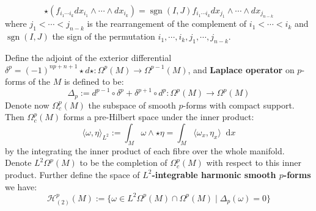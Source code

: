 \documentclass[11pt]{report}
\theoremstyle{definition}
\theoremstyle{plain}
\DeclareMathOperator{\sign}{sgn}
\newcommand{\brac}[1]{\langle #1 \rangle}
\newcommand{\mass}[1]{\mathop{}\mathrm{d}{#1}}
\begin{document}
\begin{equation}
\star (f_{i_1\cdots i_k}dx_{i_1}\wedge \cdots\wedge dx_{i_k})= \sign(I,J) f_{i_1\cdots i_k}dx_{j_1}\wedge \cdots\wedge dx_{j_{n-k}}
\end{equation}
where $j_1<\cdots <j_{n-k}$ is the rearrangement of the complement of $i_1<\cdots <i_k$ and $\sign(I, J)$ the sign of the permutation $i_1, \cdots, i_k, j_1, \cdots, j_{n-k}$.
\par Define the adjoint of the exterior differential $\delta^p=(-1)^{np+n+1}\star d \star:\Omega^p(M)\to \Omega^{p-1}(M)$, and \textbf{Laplace operator} on $p$-forms of the $M$ is defined to be:
\begin{equation}
\Delta_p:=d^{p-1}\circ \delta^p+\delta^{p+1}\circ d^p:\Omega^p(M)\to \Omega^p(M)
\end{equation}
Denote now $\Omega_c^p(M)$ the subspace of smooth $p$-forms with compact support. Then $\Omega^p_c(M)$ forms a pre-Hilbert space under the inner product:
\begin{equation}
\brac{\omega, \eta}_{L^2}:=\int_M\omega\wedge \star\eta=\int_M\brac{\omega_x, \eta_x}\mass{x}
\end{equation}
by the integrating the inner product of each fibre over the whole manifold. Denote $L^2\Omega^p(M)$ to be the completion of $\Omega^p_c(M)$ with respect to this inner product. Further define the space of \textbf{$L^2$-integrable harmonic smooth $p$-forms} we have:
\begin{equation}\label{1.55}
\mathcal{H}^p_{(2)}(M):=\{\omega\in L^2\Omega^p(M)\cap \Omega^p(M)\mid \Delta_p(\omega)=0\}
\end{equation}
\end{document}
